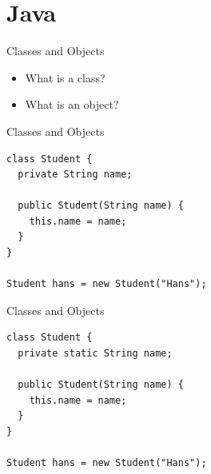 \documentclass[presentation]{beamer}
\begin{document}
\section{Java}
\label{sec:org924694f}
\begin{frame}[label={sec:org1457884}]{Classes and Objects}
\begin{itemize}
\item What is a class?
\item What is an object?
\end{itemize}
\end{frame}
\begin{frame}[label={sec:orgdea3e97},fragile]{Classes and Objects}
 \begin{verbatim}
class Student {
  private String name;

  public Student(String name) {
    this.name = name;
  }
}

Student hans = new Student("Hans");
\end{verbatim}
\end{frame}
\begin{frame}[label={sec:orgb47c110},fragile]{Classes and Objects}
 \begin{verbatim}
class Student {
  private static String name;

  public Student(String name) {
    this.name = name;
  }
}

Student hans = new Student("Hans");
\end{verbatim}
\end{frame}
\end{document}

